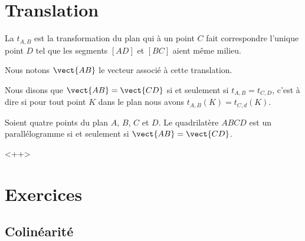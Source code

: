 
\section{Translation}

\begin{multicols}{2}
\begin{definition}
    La  \( t_{A,B}\) est la transformation du plan qui à un point \( C\) fait correspondre l'unique point \( D\) tel que les segments \( [AD]\) et \( [BC]\) aient même milieu.
\end{definition}

\columnbreak


\end{multicols}
Nous notons \( \vect{ AB }\) le vecteur associé à cette translation.

\begin{definition}
    Nous disons que \( \vect{ AB }=\vect{ CD }\) si et seulement si \( t_{A,B}=t_{C,D}\), c'est à dire si pour tout point \( K\) dans le plan nous avons \( t_{A,B}(K)=t_{C,d}(K)\).
\end{definition}

\begin{propriete}
    Soient quatre points du plan \( A\), \( B\), \( C\) et \( D\). Le quadrilatère \( ABCD\) est un parallélogramme si et seulement si \( \vect{ AB }=\vect{ CD }\).
\end{propriete}
<++>

\section{Exercices}


\subsection{Colinéarité}

